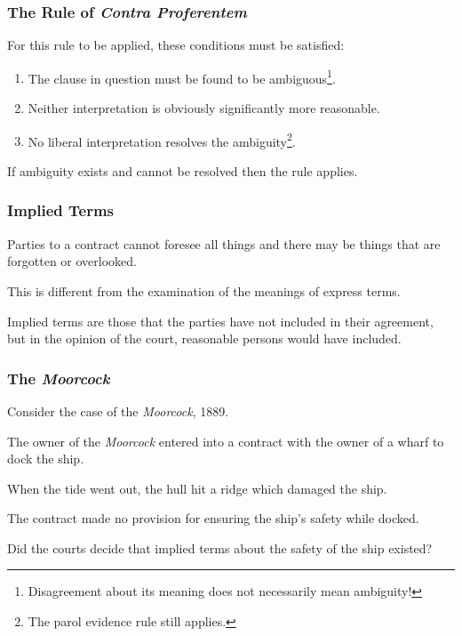 \begin{frame}
\frametitle{The Rule of \textit{Contra Proferentem}}

For this rule to be applied, these conditions must be satisfied:

\begin{enumerate}
	\item The clause in question must be found to be ambiguous\footnote{Disagreement about its meaning does not necessarily mean ambiguity!}.
	\item Neither interpretation is obviously significantly more reasonable.
	\item No liberal interpretation resolves the ambiguity\footnote{The parol evidence rule still applies.}.
\end{enumerate}

If ambiguity exists and cannot be resolved then the rule applies.

\end{frame}



\begin{frame}
\frametitle{Implied Terms}

Parties to a contract cannot foresee all things and there may be things that are forgotten or overlooked.

This is different from the examination of the meanings of express terms.

\alert{Implied terms} are those that the parties have not included in their agreement, but in the opinion of the court, reasonable persons would have included.

\end{frame}



\begin{frame}
\frametitle{The \textit{Moorcock}}

Consider the case of the \textit{Moorcock}, 1889.

The owner of the \textit{Moorcock} entered into a contract with the owner of a wharf to dock the ship.

When the tide went out, the hull hit a ridge which damaged the ship.

The contract made no provision for ensuring the ship's safety while docked.

Did the courts decide that implied terms about the safety of the ship existed?

\end{frame}



